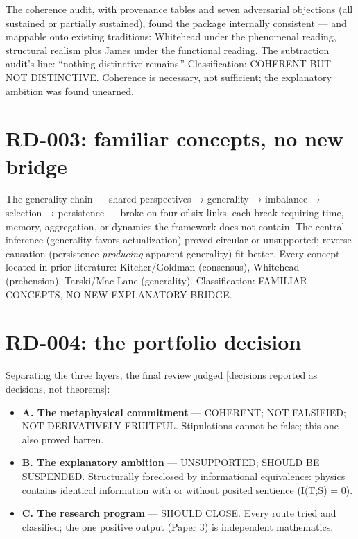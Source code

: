 \documentclass[
  11pt,
]{book}
\providecommand{\tightlist}{%
  \setlength{\itemsep}{0pt}\setlength{\parskip}{0pt}}
\begin{document}
The coherence audit, with provenance tables and seven adversarial
objections (all sustained or partially sustained), found the package
internally consistent --- and mappable onto existing traditions:
Whitehead under the phenomenal reading, structural realism plus James
under the functional reading. The subtraction audit's line: ``nothing
distinctive remains.'' Classification: COHERENT BUT NOT DISTINCTIVE.
Coherence is necessary, not sufficient; the explanatory ambition was
found unearned.

\section{RD-003: familiar concepts, no new
bridge}\label{rd-003-familiar-concepts-no-new-bridge}

The generality chain --- shared perspectives → generality → imbalance →
selection → persistence --- broke on four of six links, each break
requiring time, memory, aggregation, or dynamics the framework does not
contain. The central inference (generality favors actualization) proved
circular or unsupported; reverse causation (persistence \emph{producing}
apparent generality) fit better. Every concept located in prior
literature: Kitcher/Goldman (consensus), Whitehead (prehension),
Tarski/Mac Lane (generality). Classification: FAMILIAR CONCEPTS, NO NEW
EXPLANATORY BRIDGE.

\section{RD-004: the portfolio
decision}\label{rd-004-the-portfolio-decision}

Separating the three layers, the final review judged {[}decisions
reported as decisions, not theorems{]}:

\begin{itemize}
\tightlist
\item
  \textbf{A. The metaphysical commitment} --- COHERENT; NOT FALSIFIED;
  NOT DERIVATIVELY FRUITFUL. Stipulations cannot be false; this one also
  proved barren.
\item
  \textbf{B. The explanatory ambition} --- UNSUPPORTED; SHOULD BE
  SUSPENDED. Structurally foreclosed by informational equivalence:
  physics contains identical information with or without posited
  sentience (I(T;S) = 0).
\item
  \textbf{C. The research program} --- SHOULD CLOSE. Every route tried
  and classified; the one positive output (Paper 3) is independent
  mathematics.
\end{itemize}
\end{document}
